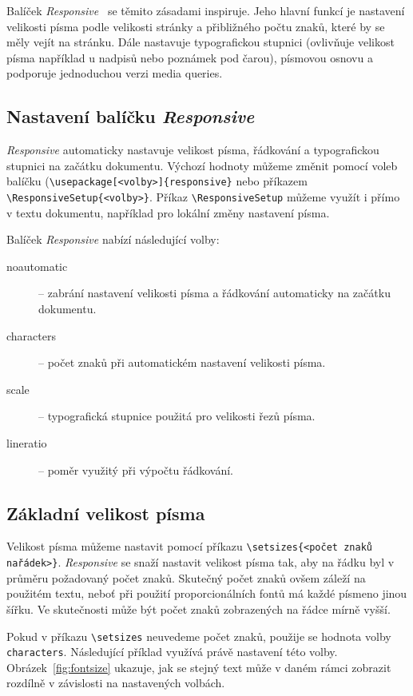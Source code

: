 \documentclass{csbulletin}
\newcommand\balicek[1]{\textit{#1}}
\begin{document}
Balíček \balicek{Responsive}~\cite{responsive} se těmito zásadami inspiruje. 
Jeho hlavní funkcí je nastavení velikosti písma podle velikosti stránky
a přibližného počtu znaků, které by se měly vejít na stránku. 
Dále nastavuje typografickou stupnici (ovlivňuje velikost písma například 
u nadpisů nebo poznámek pod čarou), písmovou osnovu a podporuje
jednoduchou verzi media queries.

\subsection{Nastavení balíčku \balicek{Responsive}}

\balicek{Responsive} automaticky nastavuje velikost písma, řádkování 
a typografickou stupnici na začátku dokumentu. Výchozí hodnoty můžeme změnit
pomocí voleb balíčku (\verb|\usepackage[<volby>]{responsive}| nebo příkazem \verb|\ResponsiveSetup{<volby>}|. 
Příkaz \verb|\ResponsiveSetup| můžeme 
využít i přímo v textu dokumentu, například pro lokální změny nastavení písma. 

Balíček \balicek{Responsive} nabízí následující volby:

\begin{description}
  \item[noautomatic] – zabrání nastavení velikosti písma a řádkování automaticky na začátku dokumentu.
  \item[characters] – počet znaků při automatickém nastavení velikosti písma.
  \item[scale] –  typografická stupnice použitá pro velikosti řezů písma.
  \item[lineratio] – poměr využitý při výpočtu řádkování.
\end{description}

\subsection{Základní velikost písma}

Velikost písma můžeme nastavit pomocí příkazu \verb|\setsizes{<počet znaků na|\allowbreak\verb|řádek>}|. 
\balicek{Responsive} se snaží nastavit velikost písma tak, aby na řádku byl v průměru
požadovaný počet znaků. Skutečný počet znaků ovšem záleží na použitém textu, 
neboť při použití proporcionálních fontů má každé písmeno jinou šířku. 
Ve skutečnosti může být počet znaků zobrazených na řádce mírně vyšší.

Pokud v příkazu \verb|\setsizes| neuvedeme počet znaků, použije se hodnota volby \texttt{characters}.
Následující příklad využívá právě nastavení této volby. Obrázek~\ref{fig:fontsize} 
ukazuje, jak se stejný text může v daném rámci zobrazit rozdílně v závislosti na
nastavených volbách.
\end{document}
